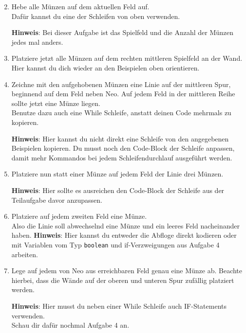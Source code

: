 \begin{enumerate} \setcounter{enumi}{1}
        \item Hebe alle Münzen auf dem aktuellen Feld auf.\\
        Dafür kannst du eine der Schleifen von oben verwenden.

    \textbf{Hinweis}: Bei dieser Aufgabe ist das Spielfeld und die Anzahl der Münzen jedes mal anders.
    \item Platziere jetzt alle Münzen auf dem rechten mittleren Spielfeld an der Wand. 
        Hier kannst du dich wieder an den Beispielen oben orientieren.
        \item Zeichne mit den aufgehobenen Münzen eine Linie auf der mittleren Spur, beginnend auf dem Feld neben Neo.
        Auf jedem Feld in der mittleren Reihe sollte jetzt eine Münze liegen.\\
        Benutze dazu auch eine While Schleife, anstatt deinen Code mehrmals zu kopieren.

    \textbf{Hinweis}: Hier kannst du nicht direkt eine Schleife von den angegebenen Beispielen kopieren.
        Du musst noch den Code-Block der Schleife anpassen, damit mehr Kommandos bei jedem Schleifendurchlauf ausgeführt werden.
    \item Platziere nun statt einer Münze auf jedem Feld der Linie drei Münzen.

    \textbf{Hinweis}: Hier sollte es ausreichen den Code-Block der Schleife aus der Teilaufgabe davor anzupassen.
    \item Platziere auf jedem zweiten Feld eine Münze.\\
        Also die Linie soll abwechselnd eine Münze und ein leeres Feld nacheinander haben.
        \textbf{Hinweis}: Hier kannst du entweder die Abfloge direkt kodieren oder mit Variablen vom Typ \lstinline{boolean} und if-Verzweigungen aus Aufgabe 4 arbeiten.
    \item \optional Lege auf jedem von Neo aus erreichbaren Feld genau eine Münze ab. 
        Beachte hierbei, dass die Wände auf der oberen und unteren Spur zufällig platziert werden.

    \textbf{Hinweis}: Hier musst du neben einer While Schleife auch IF-Statements verwenden.\\
        Schau dir dafür nochmal Aufgabe 4 an.
\end{enumerate}
